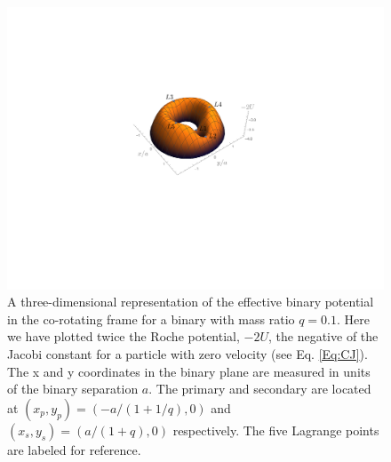 \begin{figure}
\begin{center}
\includegraphics[scale=0.55]{figures/ch2/3D_RochePot_q0p1.pdf} 
\end{center}
\caption{A three-dimensional representation of the effective binary
  potential in the co-rotating frame for a binary with mass ratio
  $q=0.1$. Here we have plotted twice the Roche potential, $-2U$, the negative of the Jacobi
  constant for a particle with zero velocity (see Eq. \ref{Eq:CJ}). The
  x and y coordinates in the binary plane are measured in units of the
  binary separation $a$. The primary and secondary are located at
  $(x_p,y_p) = (-a/(1+1/q), 0)$ and $(x_s,y_s) = (a/(1+q), 0)$
  respectively. The five Lagrange points are labeled for reference.}
\label{Fig:Roche3D}
\end{figure}


